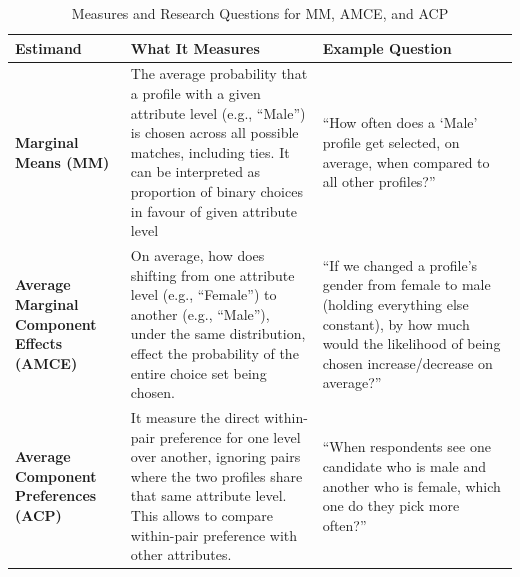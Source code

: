 \begin{table}[H]
\centering
\begin{tabular}{p{3cm} p{7cm} p{6cm}}
\toprule
\textbf{\small Estimand} & \textbf{What It Measures} & \textbf{Example Question} \\
\midrule
\textbf{\footnotesize Marginal Means (MM)} 
& The average probability that a profile with a given attribute level (e.g., ``Male'') is chosen across all possible matches, including ties. It can be interpreted as proportion of binary choices in favour of given attribute level
& ``How often does a `Male' profile get selected, on average, when compared to all other profiles?'' \\[1em]

\midrule

\textbf{\footnotesize Average Marginal Component Effects (AMCE)} 
& On average, how does shifting from one attribute level (e.g., ``Female'') to another (e.g., ``Male''), under the same distribution, effect the probability of the entire choice set being chosen.
& ``If we changed a profile’s gender from female to male (holding everything else constant), by how much would the likelihood of being chosen increase/decrease on average?'' \\[1em]

\midrule

\textbf{\footnotesize Average Component Preferences (ACP)} 
& It measure the direct within-pair preference for one level over another, ignoring pairs where the two profiles share that same attribute level. This allows to compare within-pair preference with other attributes. 
& ``When respondents see one candidate who is male and another who is female, which one do they pick more often?'' \\
\bottomrule
\end{tabular}
\caption{Measures and Research Questions for MM, AMCE, and ACP}
\label{tab:estimands}
\end{table}
